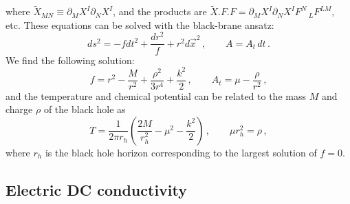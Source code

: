 \documentclass[a4paper]{jpconf}
\begin{document}
where $\tilde X_{MN}  \equiv \partial_M X^I \partial_N X^I$, and the products are $\tilde X.F.F =  \partial_M X^I \partial_N X^I F^N\,_L F^{LM}$, etc. These equations can be solved with the black-brane ansatz:
\begin{equation}
 ds^2  = -f dt^2 + \frac{dr^2}{f} + r^2 d\vec x^2 \,, \qquad A = A_t \, dt \,.
\end{equation}
We find the following solution:
\begin{equation}
f = r^2 - \frac{M}{r^2}  + \frac{\rho^2}{3 r^4} + \frac{k^2}{2} \,, \qquad A_t = \mu - \frac{\rho}{r^2} \,,
\end{equation}
and the temperature and chemical potential can be related to the mass $M$ and charge $\rho$ of the black hole as
\begin{equation}
 T = \frac{1}{2\pi r_h}\left( \frac{2M}{r_h^2} -\mu^2 - \frac{k^2}{2} \right) \,, \qquad \mu r_h^2 = \rho \,,
\end{equation}
where $r_h$ is the black hole horizon corresponding to the largest solution of $f=0$.
  


\subsection{Electric DC conductivity}
\label{subsec:DC_conductivity}
\end{document}
